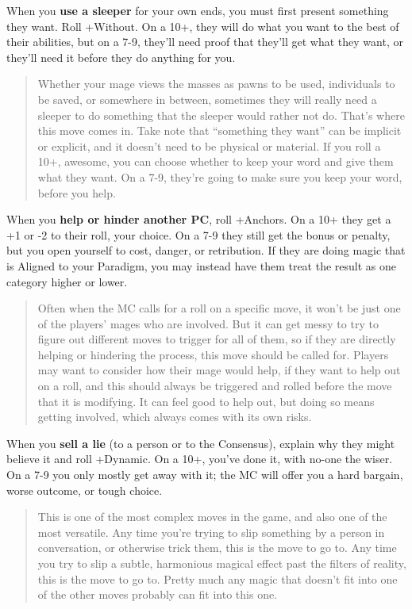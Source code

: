 \documentclass[
  oneside,
  statementpaper,
  9pt]{memoir}
\begin{document}
When you \textbf{use a sleeper} for your own ends, you must first
present something they want. Roll +Without. On a 10+, they will do what
you want to the best of their abilities, but on a 7-9, they'll need
proof that they'll get what they want, or they'll need it before they do
anything for you.

\begin{quote}
Whether your mage views the masses as pawns to be used, individuals to
be saved, or somewhere in between, sometimes they will really need a
sleeper to do something that the sleeper would rather not do. That's
where this move comes in. Take note that ``something they want'' can be
implicit or explicit, and it doesn't need to be physical or material. If
you roll a 10+, awesome, you can choose whether to keep your word and
give them what they want. On a 7-9, they're going to make sure you keep
your word, before you help.
\end{quote}

When you \textbf{help or hinder another PC}, roll +Anchors. On a 10+
they get a +1 or -2 to their roll, your choice. On a 7-9 they still get
the bonus or penalty, but you open yourself to cost, danger, or
retribution. If they are doing magic that is Aligned to your Paradigm,
you may instead have them treat the result as one category higher or
lower.

\begin{quote}
Often when the MC calls for a roll on a specific move, it won't be just
one of the players' mages who are involved. But it can get messy to try
to figure out different moves to trigger for all of them, so if they are
directly helping or hindering the process, this move should be called
for. Players may want to consider how their mage would help, if they
want to help out on a roll, and this should always be triggered and
rolled before the move that it is modifying. It can feel good to help
out, but doing so means getting involved, which always comes with its
own risks.
\end{quote}

When you \textbf{sell a lie} (to a person or to the Consensus), explain
why they might believe it and roll +Dynamic. On a 10+, you've done it,
with no-one the wiser. On a 7-9 you only mostly get away with it; the MC
will offer you a hard bargain, worse outcome, or tough choice.

\begin{quote}
This is one of the most complex moves in the game, and also one of the
most versatile. Any time you're trying to slip something by a person in
conversation, or otherwise trick them, this is the move to go to. Any
time you try to slip a subtle, harmonious magical effect past the
filters of reality, this is the move to go to. Pretty much any magic
that doesn't fit into one of the other moves probably can fit into this
one.
\end{quote}
\end{document}
